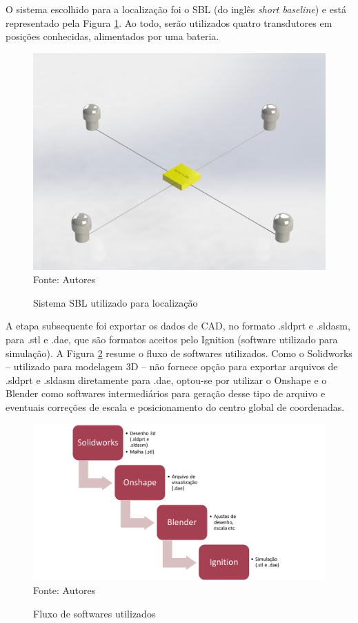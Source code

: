 O sistema escolhido para a localização foi o SBL (do inglês \textit{short baseline}) e está representado pela Figura \ref{fig:sbl}. Ao todo, serão utilizados quatro transdutores em posições conhecidas, alimentados por uma bateria.

\begin{figure}[h]
	\centering
	\caption[Sistema SBL utilizado para localização]{Sistema SBL utilizado para localização}
	\label{fig:sbl}
	\includegraphics[width=0.7\linewidth]{images/sbl}\\
	\footnotesize Fonte: Autores
\end{figure}

A etapa subsequente foi exportar os dados de CAD, no formato .sldprt e .sldasm, para .stl e .dae, que são formatos aceitos pelo Ignition (software utilizado para simulação). A Figura \ref{fig:software-flow} resume o fluxo de softwares utilizados. Como o Solidworks -- utilizado para modelagem 3D -- não fornece opção para exportar arquivos de .sldprt e .sldasm diretamente para .dae, optou-se por utilizar o Onshape e o Blender como softwares intermediários para geração desse tipo de arquivo e eventuais correções de escala e posicionamento do centro global de coordenadas.

\begin{figure}[h]
	\centering
	\caption[Fluxo de softwares utilizados]{Fluxo de softwares utilizados}
	\label{fig:software-flow}
	\includegraphics[width=1\linewidth]{images/software-flow}\\
	\footnotesize Fonte: Autores
\end{figure}


